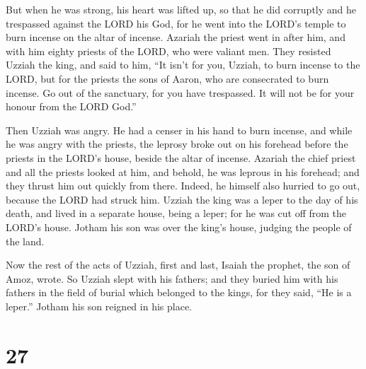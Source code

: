 But when he was strong, his heart was lifted up, so that
he did corruptly and he trespassed against the LORD his God, for he went
into the LORD's temple to burn incense on the altar of incense.
 Azariah the priest went in after him, and with him eighty
priests of the LORD, who were valiant men.  They resisted
Uzziah the king, and said to him, ``It isn't for you, Uzziah, to burn
incense to the LORD, but for the priests the sons of Aaron, who are
consecrated to burn incense. Go out of the sanctuary, for you have
trespassed. It will not be for your honour from the LORD God.''

 Then Uzziah was angry. He had a censer in his hand to burn
incense, and while he was angry with the priests, the leprosy broke out
on his forehead before the priests in the LORD's house, beside the altar
of incense.  Azariah the chief priest and all the priests
looked at him, and behold, he was leprous in his forehead; and they
thrust him out quickly from there. Indeed, he himself also hurried to go
out, because the LORD had struck him.  Uzziah the king was
a leper to the day of his death, and lived in a separate house, being a
leper; for he was cut off from the LORD's house. Jotham his son was over
the king's house, judging the people of the land.

 Now the rest of the acts of Uzziah, first and last, Isaiah
the prophet, the son of Amoz, wrote.  So Uzziah slept with
his fathers; and they buried him with his fathers in the field of burial
which belonged to the kings, for they said, ``He is a leper.'' Jotham
his son reigned in his place.

\hypertarget{section-26}{%
\section{27}\label{section-26}}

